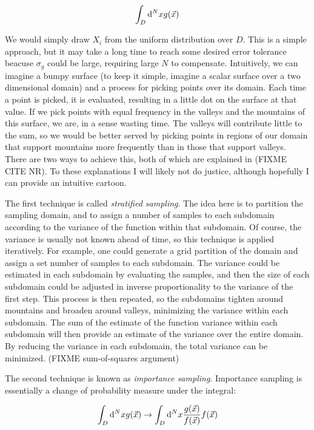 \documentclass[10pt,letterpaper]{article}
\def\d{{\rm d}}  %
\begin{document}
$$\int_{D} \d^N x g(\vec{x})$$

We would simply draw $X_i$ from the uniform distribution over $D$. This is a simple approach, but it may take a long time to reach some desired error tolerance beacuse $\sigma_g$ could be large, requiring large $N$ to compensate. Intuitively, we can imagine a bumpy surface (to keep it simple, imagine a scalar surface over a two dimensional domain) and a process for picking points over its domain. Each time a point is picked, it is evaluated, resulting in a little dot on the surface at that value. If we pick points with equal frequency in the valleys and the mountains of this surface, we are, in a sense wasting time. The valleys will contribute little to the sum, so we would be better served by picking points in regions of our domain that support mountains more frequently than in those that support valleys. There are two ways to achieve this, both of which are explained in (FIXME CITE NR). To these explanations I will likely not do justice, although hopefully I can provide an intuitive cartoon.

The first technique is called \textit{stratified sampling}. The idea here is to partition the sampling domain, and to assign a number of samples to each subdomain according to the variance of the function within that subdomain. Of course, the variance is usually not known ahead of time, so this technique is applied iteratively. For example, one could generate a grid partition of the domain and assign a set number of samples to each subdomain. The variance could be estimated in each subdomain by evaluating the samples, and then the size of each subdomain could be adjusted in inverse proportionality to the variance of the first step. This process is then repeated, so the subdomains tighten around mountains and broaden around valleys, minimizing the variance within each subdomain. The sum of the estimate of the function variance within each subdomain will then provide an estimate of the variance over the entire domain. By reducing the variance in each subdomain, the total variance can be minimized. (FIXME sum-of-squares argument)

The second technique is known as \textit{importance sampling}. Importance sampling is essentially a change of probability measure under the integral:

\begin{equation} \label{eq:importance}
\int_{D} \d^N x g(\vec{x}) \rightarrow \int_{D} \d^N x \displaystyle{\frac{g(\vec{x})}{f(\vec{x})}} f(\vec{x})
\end{equation}
\end{document}
